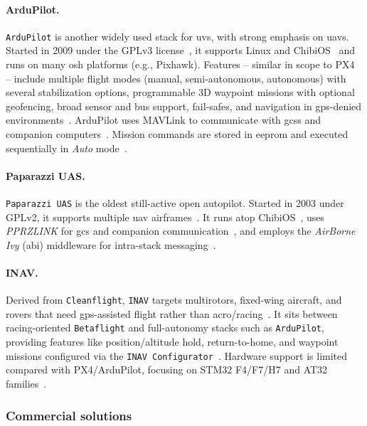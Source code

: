 \paragraph{ArduPilot.}
\lstinline|ArduPilot| is another widely used stack for \glspl{uv}, with strong emphasis on \glspl{uav}. 
Started in 2009 under the GPLv3 license~\cite{arduPilotHistory}, it supports Linux and ChibiOS~\cite{arduPilot-github,jargalsaikhan2022architectural} and runs on many \gls{osh} platforms (e.g., Pixhawk). 
Features -- similar in scope to PX4~\cite{px4-features} -- include multiple flight modes (manual, semi-autonomous, autonomous) with several stabilization options, programmable 3D waypoint missions with optional geofencing, broad sensor and bus support, fail-safes, and navigation in \gls{gps}-denied environments~\cite{arduPilot-home}. 
ArduPilot uses MAVLink to communicate with \glspl{gcs} and companion computers~\cite{arduPilot-home}. 
Mission commands are stored in \gls{eeprom} and executed sequentially in \emph{Auto} mode~\cite{ardupilot-mavlink}.

\paragraph{Paparazzi UAS.}
\lstinline|Paparazzi UAS| is the oldest still-active open autopilot. 
Started in 2003 under GPLv2, it supports multiple \gls{uav}
airframes~\cite{paparazzi-home}.
It runs atop ChibiOS~\cite{paparazzi-sysOverv}, uses \emph{PPRZLINK} for
\gls{gcs} and companion communication~\cite{paparazzi-sysOverv}, and employs the
\emph{AirBorne Ivy} (\gls{abi}) middleware for intra-stack
messaging~\cite{jargalsaikhan2022architectural}.

\paragraph{INAV.}
Derived from \lstinline|Cleanflight|, \lstinline|INAV| targets multirotors,
fixed-wing aircraft, and rovers that need \gls{gps}-assisted flight rather than
acro/racing~\cite{inav-github}.
It sits between racing-oriented \lstinline|Betaflight| and full-autonomy stacks
such as \lstinline|ArduPilot|, providing features like position/altitude hold,
return-to-home, and waypoint missions configured via the
\lstinline|INAV Configurator|~\cite{inav-github}.
Hardware support is limited compared with PX4/ArduPilot, focusing on STM32
F4/F7/H7 and AT32 families~\cite{inav-github}.

\subsubsection{Commercial solutions}%
\label{sec:commercial-solutions-sw}

